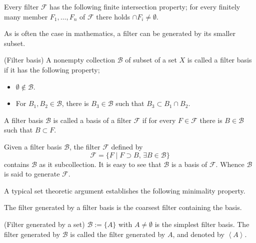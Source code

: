 \documentclass{article}
\begin{document}
\begin{rem}
    Every filter \( \mathscr{F} \) has the following finite intersection property; for every finitely many member \( F_1 ,\ldots, F_n \) of \( \mathscr{F} \) there holds \( \cap F_i \neq \emptyset \).
\end{rem}

As is often the case in mathematics, a filter can be generated by its smaller subset.
\begin{dfn} (Filter basis)
    A nonempty collection \( \mathscr{B} \) of subset of a set \( X \) is called a filter basis if it has the following property;
    \begin{itemize}
        \item \( \emptyset \notin \mathscr{B} \).
        \item For \( B_1, B_2 \in \mathscr{B} \), there is \( B_3 \in \mathscr{B} \) such that \( B_3 \subset B_1 \cap B_2 \).
    \end{itemize}

    A filter basis \( \mathscr{B} \) is called a basis of a filter \( \mathscr{F}  \) if for every \( F \in \mathscr{F} \) there is \( B \in \mathscr{B} \) such that \( B \subset F \).
\end{dfn}

\begin{rem}
    Given a filter basis \( \mathscr{B} \), the filter \( \mathscr{F} \) defined by
    \begin{equation*}
        \mathscr{F} = \{F \mid F \supset B,\,\exists B \in \mathscr{B}\}
    \end{equation*}
    contains \( \mathscr{B} \) as it subcollection. It is easy to see that \( \mathscr{B} \) is a basis of \( \mathscr{F} \). Whence \( \mathscr{B} \) is said to generate \( \mathscr{F} \).
\end{rem}

A typical set theoretic argument establishes the following minimality property.
\begin{prp}\label{coarsest generation}
    The filter generated by a filter basis is the coarsest filter containing the basis.
\end{prp}

\begin{ex} (Filter generated by a set)
    \( \mathscr{B}:=\{A\} \) with \( A \neq \emptyset \) is the simplest filter basis. The filter generated by \( \mathscr{B} \) is called the filter generated by \( A \), and denoted by \( \left< A \right> \).
\end{ex}
\end{document}

